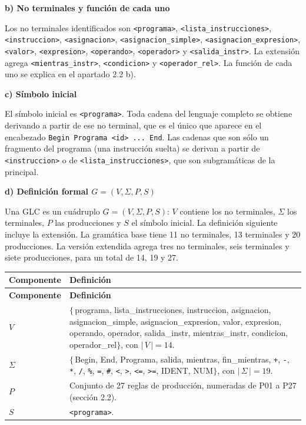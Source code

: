 \documentclass[11pt,letterpaper]{article}
\newcommand{\apartado}[1]{\par\Needspace{4\baselineskip}\medskip\noindent\textbf{#1}\par\nobreak\smallskip}
\newcommand{\nt}[1]{\texttt{\textless #1\textgreater}}
\begin{document}
\apartado{b) No terminales y función de cada uno}

{\raggedright
Los no terminales identificados son \nt{programa}, \nt{lista\_instrucciones},
\nt{instruccion}, \nt{asignacion}, \nt{asignacion\_simple}, \nt{asignacion\_expresion},
\nt{valor}, \nt{expresion}, \nt{operando}, \nt{operador} y \nt{salida\_instr}.
La extensión agrega \nt{mientras\_instr}, \nt{condicion} y \nt{operador\_rel}.
La función de cada uno se explica en el apartado 2.2 b).\par}

\apartado{c) Símbolo inicial}

El símbolo inicial es \nt{programa}. Toda cadena del lenguaje completo se obtiene derivando a
partir de ese no terminal, que es el único que aparece en el encabezado
\texttt{Begin Programa <id> ... End}. Las cadenas que son sólo un fragmento del programa (una
instrucción suelta) se derivan a partir de \nt{instruccion} o de \nt{lista\_instrucciones}, que son
subgramáticas de la principal.

\apartado{d) Definición formal $G=(V,\Sigma,P,S)$}

Una GLC es un cuádruplo $G=(V,\Sigma,P,S)$: $V$ contiene los no terminales, $\Sigma$ los terminales,
$P$ las producciones y $S$ el símbolo inicial. La definición siguiente incluye la extensión.
La gramática base tiene 11 no terminales, 13 terminales y 20 producciones. La versión extendida
agrega tres no terminales, seis terminales y siete producciones, para un total de 14, 19 y 27.

\begin{longtable}{|L{2.7cm}|L{\dimexpr\textwidth-2.7cm-4\arrayrulewidth\relax}|}
\hline
{}\textbf{Componente} & \textbf{Definición}\\\hline
\endfirsthead
\hline
{}\textbf{Componente} & \textbf{Definición}\\\hline
\endhead

{\small $V$} & $\{\,$programa, lista\_instrucciones, instruccion, asignacion, asignacion\_simple,
asignacion\_expresion, valor, expresion, operando, operador, salida\_instr, mientras\_instr,
condicion, operador\_rel$\}$, con $|\,V\,|=14$.\\\hline
{\small $\Sigma$} & $\{\,$Begin, End, Programa, salida, mientras, fin\_mientras, \texttt{+}, \texttt{-}, \allowbreak
\texttt{*}, \texttt{/}, \texttt{\%}, \texttt{=}, \texttt{\#}, \texttt{<}, \texttt{>}, \allowbreak
\texttt{\textless=}, \texttt{\textgreater=}, IDENT, NUM$\}$, con $|\,\Sigma\,|=19$.\\\hline
$P$ & Conjunto de 27 reglas de producción, numeradas de P01 a P27 (sección 2.2).\\\hline
$S$ & \nt{programa}.\\\hline
\end{longtable}
\end{document}
